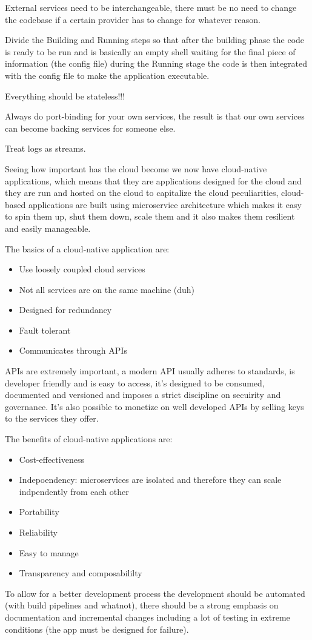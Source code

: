 External services need to be interchangeable, there must be no need to change the codebase if a
certain provider has to change for whatever reason.

Divide the Building and Running steps so that after the building phase the code is ready to be run
and is basically an empty shell waiting for the final piece of information (the config file) during
the Running stage the code is then integrated with the config file to make the application
executable.

Everything should be stateless!!!

Always do port-binding for your own services, the result is that our own services can become backing
services for someone else.

Treat logs as streams.

Seeing how important has the cloud become we now have cloud-native applications, which means that
they are applications designed for the cloud and they are run and hosted on the cloud to capitalize
the cloud peculiarities, cloud-based applications are built using microservice architecture which
makes it easy to spin them up, shut them down, scale them and it also makes them resilient and
easily manageable.

The basics of a cloud-native application are:
\begin{itemize}
    \item Use loosely coupled cloud services
    \item Not all services are on the same machine (duh)
    \item Designed for redundancy
    \item Fault tolerant
    \item Communicates through APIs
\end{itemize}
APIs are extremely important, a modern API usually adheres to standards, is developer friendly and is easy to access, it's designed to be consumed, documented and versioned and imposes a strict discipline on secuirity and governance. It's also possible to monetize on well developed APIs by selling keys to the services they offer.

The benefits of cloud-native applications are:
\begin{itemize}
    \item Cost-effectiveness
    \item Indepoendency: microservices are isolated and therefore they can scale indpendently from each other
    \item Portability
    \item Reliability
    \item Easy to manage
    \item Transparency and composabililty
\end{itemize}
To allow for a better development process the development should be automated (with build pipelines and whatnot), there should be a strong emphasis on documentation and incremental changes including a lot of testing in extreme conditions (the app must be designed for failure).
